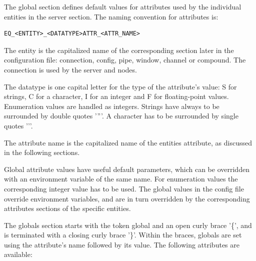 \documentclass[10pt,a4]{scrartcl}
\begin{document}
The global section defines default values for attributes used by the
individual entities in the server section. The naming convention for
attributes is:

{\footnotesize\begin{lstlisting}
EQ_<ENTITY>_<DATATYPE>ATTR_<ATTR_NAME>
\end{lstlisting}}

The entity is the capitalized name of the corresponding section later in
the configuration file: connection, config, pipe, window, channel or
compound. The connection is used by the server and nodes.

The datatype is one capital letter for the type of the attribute's
value: \textsf{S} for strings, \textsf{C} for a character, \textsf{I}
for an integer and \textsf{F} for floating-point values. Enumeration
values are handled as integers. Strings have always to be surrounded by
double quotes '\textsf{''}'. A character has to be surrounded by single
quotes '\textsf{'}'.

The attribute name is the capitalized name of the entities attribute, as
discussed in the following sections.

Global attribute values have useful default parameters, which can be
overridden with an environment variable of the same name. For enumeration
values the corresponding integer value has to be used. The global values
in the config file override environment variables, and are in turn
overridden by the corresponding attributes sections of the specific
entities.

The globals section starts with the token \textsf{global} and an open
curly brace '\textsf{\{}', and is terminated with a closing curly brace
'\textsf{\}}'. Within the braces, globals are set using the attribute's
name followed by its value. The following attributes are available:
\end{document}
